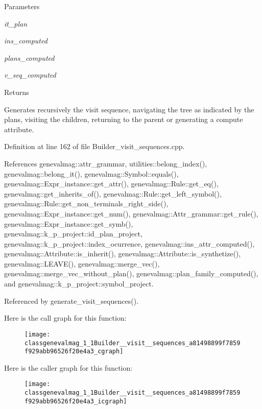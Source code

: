 \begin{DoxyParams}{Parameters}
\item[{\em it\_\-plan}]\item[{\em ins\_\-computed}]\item[{\em plans\_\-computed}]\item[{\em v\_\-seq\_\-computed}]\end{DoxyParams}
\begin{DoxyReturn}{Returns}

\end{DoxyReturn}
Generates recursively the visit sequence, navigating the tree as indicated by the plans, visiting the children, returning to the parent or generating a compute attribute. 

Definition at line 162 of file Builder\_\-visit\_\-sequences.cpp.



References genevalmag::attr\_\-grammar, utilities::belong\_\-index(), genevalmag::belong\_\-it(), genevalmag::Symbol::equals(), genevalmag::Expr\_\-instance::get\_\-attr(), genevalmag::Rule::get\_\-eq(), genevalmag::get\_\-inherits\_\-of(), genevalmag::Rule::get\_\-left\_\-symbol(), genevalmag::Rule::get\_\-non\_\-terminals\_\-right\_\-side(), genevalmag::Expr\_\-instance::get\_\-num(), genevalmag::Attr\_\-grammar::get\_\-rule(), genevalmag::Expr\_\-instance::get\_\-symb(), genevalmag::k\_\-p\_\-project::id\_\-plan\_\-project, genevalmag::k\_\-p\_\-project::index\_\-ocurrence, genevalmag::ins\_\-attr\_\-computed(), genevalmag::Attribute::is\_\-inherit(), genevalmag::Attribute::is\_\-synthetize(), genevalmag::LEAVE(), genevalmag::merge\_\-vec(), genevalmag::merge\_\-vec\_\-without\_\-plan(), genevalmag::plan\_\-family\_\-computed(), and genevalmag::k\_\-p\_\-project::symbol\_\-project.



Referenced by generate\_\-visit\_\-sequences().



Here is the call graph for this function:\nopagebreak
\begin{figure}[H]
\begin{center}
\leavevmode
\texttt{[image: classgenevalmag\_1\_1Builder\_\_visit\_\_sequences\_a81498899f7859f929abb96526f20e4a3\_cgraph]}
\end{center}
\end{figure}




Here is the caller graph for this function:\nopagebreak
\begin{figure}[H]
\begin{center}
\leavevmode
\texttt{[image: classgenevalmag\_1\_1Builder\_\_visit\_\_sequences\_a81498899f7859f929abb96526f20e4a3\_icgraph]}
\end{center}
\end{figure}


